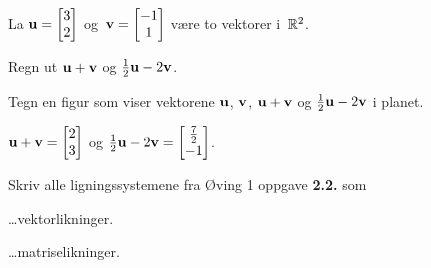 
\begin{oppgave}
La $\mathbf{u} = \begin{bmatrix} 3 \\ 2 \end{bmatrix}$ og~$\mathbf{v} = \begin{bmatrix} -1 \\ 1 \end{bmatrix}$ være to vektorer
i~$\mathbb{R}^2$.

\begin{punkt}
Regn ut $\mathbf{u} + \mathbf{v}$ og $\frac{1}{2} \mathbf{u} - 2 \mathbf{v}$.
\end{punkt}

\begin{punkt}
Tegn en figur som viser vektorene $\mathbf{u}$, $\mathbf{v}$, $\mathbf{u} + \mathbf{v}$ og
$\frac{1}{2} \mathbf{u} - 2 \mathbf{v}$ i planet.
\end{punkt}
\end{oppgave}

\begin{losning}
\begin{punkt}
	$\mathbf{u} + \mathbf{v}=
	\begin{bmatrix}
	2\\
	3
	\end{bmatrix}
	$ og $\frac{1}{2} \mathbf{u} - 2 \mathbf{v}=
	\begin{bmatrix}
	\frac{7}{2}\\
	-1
	\end{bmatrix}
	$.
\end{punkt}

\begin{punkt}
\end{punkt}
\begin{center}
\end{center}
\end{losning}

\begin{oppgave}
Skriv alle ligningssystemene fra Øving 1 oppgave \textbf{2.2.} som

\begin{punkt}
\ldots vektorlikninger.
\end{punkt}

\begin{punkt}
\ldots matriselikninger.
\end{punkt}

\end{oppgave}

